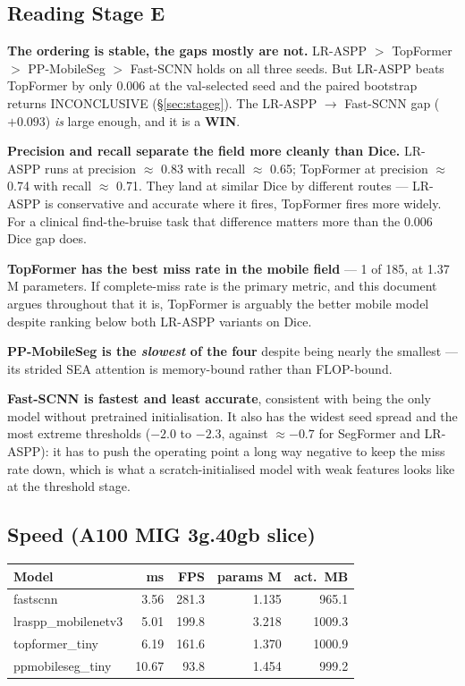 \documentclass[11pt]{article}
\newcommand{\win}{\textcolor{wingreen}{\textbf{WIN}}}
\begin{document}
\subsection{Reading Stage E}

\textbf{The ordering is stable, the gaps mostly are not.} LR-ASPP $>$ TopFormer
$>$ PP-MobileSeg $>$ Fast-SCNN holds on all three seeds. But LR-ASPP beats
TopFormer by only 0.006 at the val-selected seed and the paired bootstrap returns
INCONCLUSIVE (\S\ref{sec:stageg}). The LR-ASPP $\rightarrow$ Fast-SCNN gap
($+0.093$) \emph{is} large enough, and it is a \win.

\textbf{Precision and recall separate the field more cleanly than Dice.} LR-ASPP
runs at precision $\approx$ 0.83 with recall $\approx$ 0.65; TopFormer at
precision $\approx$ 0.74 with recall $\approx$ 0.71. They land at similar Dice by
different routes --- LR-ASPP is conservative and accurate where it fires,
TopFormer fires more widely. For a clinical find-the-bruise task that difference
matters more than the 0.006 Dice gap does.

\textbf{TopFormer has the best miss rate in the mobile field} --- 1 of 185, at
1.37\,M parameters. If complete-miss rate is the primary metric, and this document
argues throughout that it is, TopFormer is arguably the better mobile model
despite ranking below both LR-ASPP variants on Dice.

\textbf{PP-MobileSeg is the \emph{slowest} of the four} despite being nearly the
smallest --- its strided SEA attention is memory-bound rather than FLOP-bound.

\textbf{Fast-SCNN is fastest and least accurate}, consistent with being the only
model without pretrained initialisation. It also has the widest seed spread and
the most extreme thresholds ($-2.0$ to $-2.3$, against $\approx-0.7$ for SegFormer
and LR-ASPP): it has to push the operating point a long way negative to keep the
miss rate down, which is what a scratch-initialised model with weak features looks
like at the threshold stage.

\subsection{Speed (A100 MIG 3g.40gb slice)}

\begin{center}
\begin{tabular}{Lnnnn}
\toprule
\textbf{Model} & \textbf{ms} & \textbf{FPS} & \textbf{params M} & \textbf{act.\ MB} \\
\midrule
fastscnn & 3.56 & 281.3 & 1.135 & 965.1 \\
lraspp\_mobilenetv3 & 5.01 & 199.8 & 3.218 & 1009.3 \\
topformer\_tiny & 6.19 & 161.6 & 1.370 & 1000.9 \\
ppmobileseg\_tiny & 10.67 & 93.8 & 1.454 & 999.2 \\
\bottomrule
\end{tabular}
\end{center}
\end{document}
